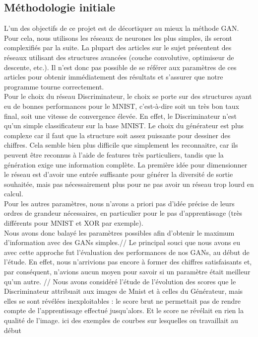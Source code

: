 	\subsection{Méthodologie initiale}
		L'un des objectifs de ce projet est de décortiquer au mieux la méthode GAN. Pour cela, nous utilisons les réseaux de neurones les plus simples, ils seront complexifiés par la suite. La plupart des articles sur le sujet présentent des réseaux utilisant des structures avancées (couche convolutive, optimiseur de descente, etc.). Il n'est donc pas possible de se référer aux paramètres de ces articles pour obtenir immédiatement des résultats et s'assurer que notre programme tourne correctement. \\
		Pour le choix du réseau Discriminateur, le choix se porte sur des structures ayant eu de bonnes performances pour le MNIST, c'est-à-dire soit un très bon taux final, soit une vitesse de convergence élevée. En effet, le Discriminateur n'est qu'un simple classificateur sur la base MNIST. Le choix du générateur est plus complexe car il faut que la structure soit assez puissante pour dessiner des chiffres. Cela semble bien plus difficile que simplement les reconnaitre, car ils peuvent être reconnus à l'aide de features très particuliers, tandis que la génération exige une information complète. La première idée pour dimensionner le réseau est d'avoir une entrée suffisante pour générer la diversité de sortie souhaitée, mais pas nécessairement plus pour ne pas avoir un réseau trop lourd en calcul.\\
		Pour les autres paramètres, nous n'avons a priori pas d'idée précise de leurs ordres de grandeur nécessaires, en particulier pour le pas d'apprentissage (très différents pour MNIST et XOR par exemple).\\
		Nous avons donc balayé les paramètres possibles afin d'obtenir le maximum d'information avec des GANs simples.//
		Le principal souci que nous avons eu avec cette approche fut l'évaluation des performances de nos GANs, au début de l'étude. En effet, nous n'arrivions pas encore à former des chiffres satisfaisants et, par conséquent, n'avions aucun moyen pour savoir si un paramètre était meilleur qu'un autre. //
		Nous avons considéré l'étude de l'évolution des scores que le Discriminateur attribuait aux images de Mnist et à celles du Générateur, mais elles se sont révélées inexploitables : le score brut ne permettait pas de rendre compte de l'apprentissage effectué jusqu'alors. Et le score ne révélait en rien la qualité de l'image. 
{ici des exemples de courbes sur lesquelles on travaillait au début } 




